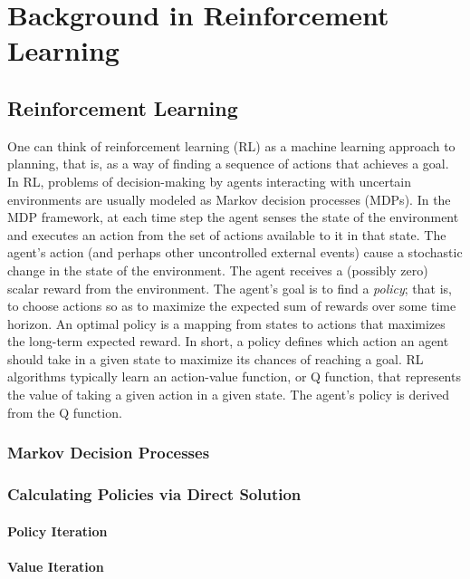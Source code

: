 \chapter{Background in Reinforcement Learning}



\section{Reinforcement Learning}

One can think of reinforcement learning (RL) \cite{sutton1998reinforcement,kaelbling1996reinforcement} as a machine learning approach to planning, that is, as a way of finding a sequence of actions that achieves a goal.  In RL, problems of decision-making by agents interacting with uncertain environments are usually modeled as Markov decision processes (MDPs). In the MDP framework, at each time step the agent senses the state of the environment and executes an action from the set of actions available to it in that state. The agent's action (and perhaps other uncontrolled external events) cause a stochastic change in the state of the environment. The agent receives a (possibly zero) scalar reward from the environment. The agent's goal is to find a {\it policy}; that is, to choose actions so as to maximize the expected sum of rewards over some time horizon. An optimal policy is a mapping from states to actions that maximizes the long-term expected reward.  In short, a policy defines which action an agent should take in a given state to maximize its chances of reaching a goal.  RL algorithms typically learn an action-value function, or Q function, that represents the value of taking a given action in a given state.  The agent's policy is derived from the Q function.

\subsection{Markov Decision Processes}


\subsection{Calculating Policies via Direct Solution}

\subsubsection{Policy Iteration}

\subsubsection{Value Iteration}

